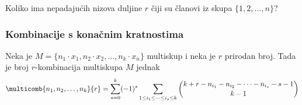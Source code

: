 \begin{example}
    Koliko ima nepadajućih nizova duljine $r$ čiji su članovi iz skupa
    $\{1,2,\dots,n\}$?
\end{example}

\subsubsection{Kombinacije s konačnim kratnostima}

\begin{theorem}
    Neka je $M=\{n_1 \cdot x_1, n_2 \cdot x_2, \dots, n_k \cdot x_n\}$
    multiskup i neka je $r$ prirodan broj. Tada je broj $r$-kombinacija
    multiskupa $M$ jednak
    $$
        \multicomb{n_1,n_2,\dots,n_k}{r} = \sum_{s=0}^{k} (-1)^s \sum_{1 \leq i_1 \leq \dots \leq i_s \leq k} \binom{k+r-n_{i_1}-n_{i_2}-\dots-n_{i_s}-s-1}{k-1}
    $$
\end{theorem}

